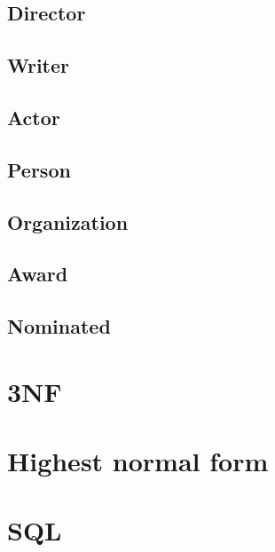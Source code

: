 {\subsection*{Director}
\begin{itemize}
\end{itemize}

\subsection*{Writer}
\begin{itemize}
\end{itemize}

\subsection*{Actor}
\begin{itemize}
\end{itemize}

\subsection*{Person}
\begin{itemize}
\end{itemize}

\subsection*{Organization}
\begin{itemize}
\end{itemize}

\subsection*{Award}
\begin{itemize}
\end{itemize}

\subsection*{Nominated}
\begin{itemize}
\end{itemize}
}
\section{3NF}

\section{Highest normal form}

\section{SQL}